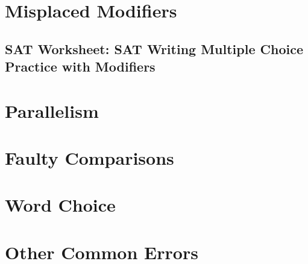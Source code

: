 \section{Misplaced Modifiers}
\subsection{SAT Worksheet: SAT Writing Multiple Choice Practice with Modifiers}
\section{Parallelism}
\section{Faulty Comparisons}
\section{Word Choice}
\section{Other Common Errors}